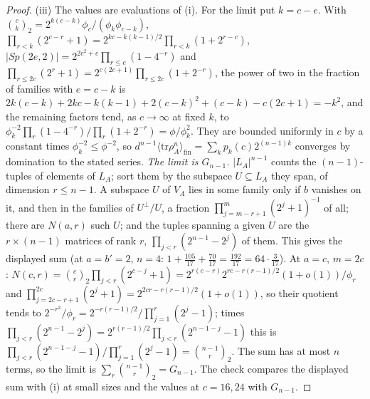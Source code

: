 \begin{proof}
(iii) The values are evaluations of (i). For the limit put $k = c - e$. With $\binom{c}{k}_{2} = 2^{k(c-k)}\phi_{c}/(\phi_{k}\phi_{c-k})$, $\prod_{r<k}(2^{c-r} + 1) = 2^{kc - k(k-1)/2}\prod_{r<k}(1 + 2^{r-c})$, $|Sp(2e,2)| = 2^{2e^{2} + e}\prod_{r \le e}(1 - 4^{-r})$ and $\prod_{r \le 2c}(2^{r} + 1) = 2^{c(2c+1)}\prod_{r \le 2c}(1 + 2^{-r})$, the power of two in the fraction of families with $e = c - k$ is $2k(c - k) + 2kc - k(k - 1) + 2(c - k)^{2} + (c - k) - c(2c + 1) = -k^{2}$, and the remaining factors tend, as $c \to \infty$ at fixed $k$, to $\phi_{k}^{-2}\prod_{r}(1 - 4^{-r})/\prod_{r}(1 + 2^{-r}) = \phi/\phi_{k}^{2}$. They are bounded uniformly in $c$ by a constant times $\phi_{k}^{-2} \le \phi^{-2}$, so $d^{n-1}\langle\mathrm{tr}\rho_{A}^{n}\rangle_{\mathrm{fin}} = \sum_{k}p_{k}(c)2^{(n-1)k}$ converges by domination to the stated series. \emph{The limit is $G_{n-1}$.} $|L_{A}|^{n-1}$ counts the $(n-1)$-tuples of elements of $L_{A}$; sort them by the subspace $U \subseteq L_{A}$ they span, of dimension $r \le n - 1$. A subspace $U$ of $V_{A}$ lies in some family only if $b$ vanishes on it, and then in the families of $U^{\perp}/U$, a fraction $\prod_{j=m-r+1}^{m}(2^{j} + 1)^{-1}$ of all; there are $N(a, r)$ such $U$; and the tuples spanning a given $U$ are the $r \times (n-1)$ matrices of rank $r$, $\prod_{j<r}(2^{n-1} - 2^{j})$ of them. This gives the displayed sum (at $a = b' = 2$, $n = 4$: $1 + \tfrac{105}{17} + \tfrac{70}{17} = \tfrac{192}{17} = 64 \cdot \tfrac{3}{17}$). At $a = c$, $m = 2c$: $N(c, r) = \binom{c}{r}_{2}\prod_{j<r}(2^{c-j} + 1) = 2^{r(c-r)}2^{rc - r(r-1)/2}(1 + o(1))/\phi_{r}$ and $\prod_{j=2c-r+1}^{2c}(2^{j} + 1) = 2^{2cr - r(r-1)/2}(1 + o(1))$, so their quotient tends to $2^{-r^{2}}/\phi_{r} = 2^{-r(r-1)/2}/\prod_{j=1}^{r}(2^{j} - 1)$; times $\prod_{j<r}(2^{n-1} - 2^{j}) = 2^{r(r-1)/2}\prod_{j<r}(2^{n-1-j} - 1)$ this is $\prod_{j<r}(2^{n-1-j} - 1)/\prod_{j=1}^{r}(2^{j} - 1) = \binom{n-1}{r}_{2}$. The sum has at most $n$ terms, so the limit is $\sum_{r}\binom{n-1}{r}_{2} = G_{n-1}$. The check compares the displayed sum with (i) at small sizes and the values at $c = 16, 24$ with $G_{n-1}$.


\end{proof}
